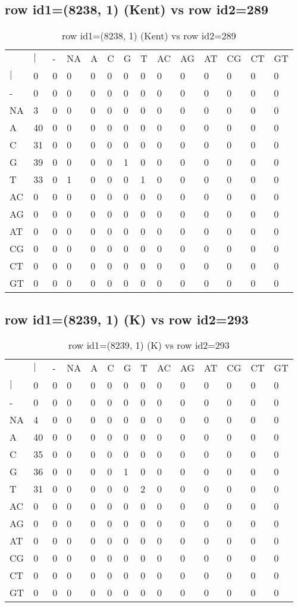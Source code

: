\subsection{row id1=(8238, 1) (Kent) vs row id2=289}
\begin{center}
\begin{longtable}{|l|l|l|l|l|l|l|l|l|l|l|l|l|l|}
\caption{row id1=(8238, 1) (Kent) vs row id2=289} \label{table_dm166}\\
\hline
\\
\hline
&$|$&-&NA&A&C&G&T&AC&AG&AT&CG&CT&GT\\
$|$&0&0&0&0&0&0&0&0&0&0&0&0&0\\
-&0&0&0&0&0&0&0&0&0&0&0&0&0\\
NA&3&0&0&0&0&0&0&0&0&0&0&0&0\\
A&40&0&0&0&0&0&0&0&0&0&0&0&0\\
C&31&0&0&0&0&0&0&0&0&0&0&0&0\\
G&39&0&0&0&0&1&0&0&0&0&0&0&0\\
T&33&0&1&0&0&0&1&0&0&0&0&0&0\\
AC&0&0&0&0&0&0&0&0&0&0&0&0&0\\
AG&0&0&0&0&0&0&0&0&0&0&0&0&0\\
AT&0&0&0&0&0&0&0&0&0&0&0&0&0\\
CG&0&0&0&0&0&0&0&0&0&0&0&0&0\\
CT&0&0&0&0&0&0&0&0&0&0&0&0&0\\
GT&0&0&0&0&0&0&0&0&0&0&0&0&0\\
\hline
\end{longtable}
\end{center}

\subsection{row id1=(8239, 1) (K) vs row id2=293}
\begin{center}
\begin{longtable}{|l|l|l|l|l|l|l|l|l|l|l|l|l|l|}
\caption{row id1=(8239, 1) (K) vs row id2=293} \label{table_dm168}\\
\hline
\\
\hline
&$|$&-&NA&A&C&G&T&AC&AG&AT&CG&CT&GT\\
$|$&0&0&0&0&0&0&0&0&0&0&0&0&0\\
-&0&0&0&0&0&0&0&0&0&0&0&0&0\\
NA&4&0&0&0&0&0&0&0&0&0&0&0&0\\
A&40&0&0&0&0&0&0&0&0&0&0&0&0\\
C&35&0&0&0&0&0&0&0&0&0&0&0&0\\
G&36&0&0&0&0&1&0&0&0&0&0&0&0\\
T&31&0&0&0&0&0&2&0&0&0&0&0&0\\
AC&0&0&0&0&0&0&0&0&0&0&0&0&0\\
AG&0&0&0&0&0&0&0&0&0&0&0&0&0\\
AT&0&0&0&0&0&0&0&0&0&0&0&0&0\\
CG&0&0&0&0&0&0&0&0&0&0&0&0&0\\
CT&0&0&0&0&0&0&0&0&0&0&0&0&0\\
GT&0&0&0&0&0&0&0&0&0&0&0&0&0\\
\hline
\end{longtable}
\end{center}

